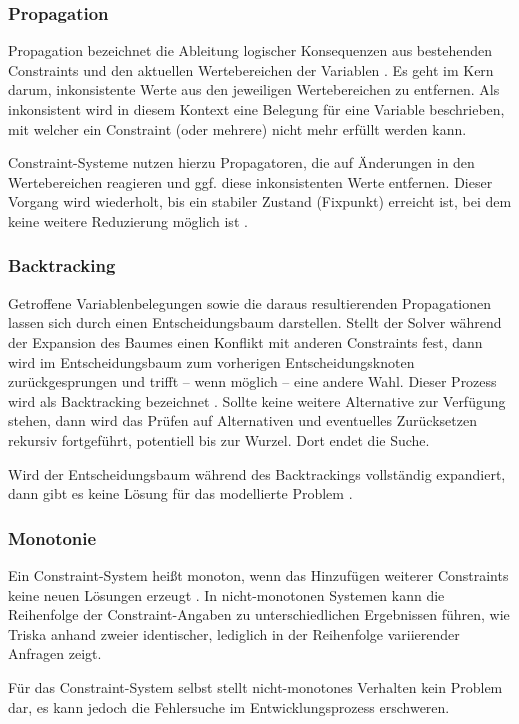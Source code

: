 \documentclass[12pt,a4paper]{article}
\begin{document}
\subsubsection{Propagation}
Propagation bezeichnet die Ableitung logischer Konsequenzen aus bestehenden Constraints und den aktuellen Wertebereichen der Variablen \cite{clp92}.
Es geht im Kern darum, inkonsistente Werte aus den jeweiligen Wertebereichen zu entfernen.
Als \glqq inkonsistent\grqq{} wird in diesem Kontext eine Belegung für eine Variable beschrieben, mit welcher ein Constraint (oder mehrere) nicht mehr erfüllt werden kann.

Constraint-Systeme nutzen hierzu Propagatoren, die auf Änderungen in den Wertebereichen reagieren und ggf. diese inkonsistenten Werte entfernen.
Dieser Vorgang wird wiederholt, bis ein stabiler Zustand (Fixpunkt) erreicht ist, bei dem keine weitere Reduzierung möglich ist \cite{clp_handbook}.
\subsubsection{Backtracking}
\label{sec:backtracking}
Getroffene Variablenbelegungen sowie die daraus resultierenden Propagationen lassen sich durch einen Entscheidungsbaum darstellen.
Stellt der Solver während der Expansion des Baumes einen Konflikt mit anderen Constraints fest, dann wird im Entscheidungsbaum zum vorherigen Entscheidungsknoten zurückgesprungen und trifft -- wenn möglich -- eine andere Wahl.
Dieser Prozess wird als Backtracking bezeichnet \cite{clp_handbook}. 
Sollte keine weitere Alternative zur Verfügung stehen, dann wird das Prüfen auf Alternativen und eventuelles Zurücksetzen rekursiv fortgeführt, potentiell bis zur Wurzel.
Dort endet die Suche.

Wird der Entscheidungsbaum während des Backtrackings vollständig expandiert, dann gibt es keine Lösung für das modellierte Problem \cite{clp_book2}.
\subsubsection{Monotonie}
Ein Constraint-System heißt monoton, wenn das Hinzufügen weiterer Constraints keine neuen Lösungen erzeugt \cite{drt}\cite{swi-clpfd-doc}.
In nicht-monotonen Systemen kann die Reihenfolge der Constraint-Angaben zu unterschiedlichen Ergebnissen führen, wie Triska \cite[S. 37]{drt} anhand zweier identischer, lediglich in der Reihenfolge variierender Anfragen zeigt.

Für das Constraint-System selbst stellt nicht-monotones Verhalten kein Problem dar, es kann jedoch die Fehlersuche im Entwicklungsprozess erschweren.
\end{document}
